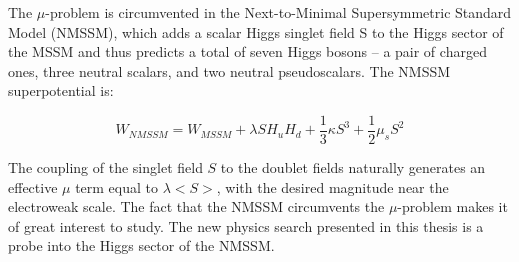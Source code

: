 The $\mu$-problem is circumvented in the Next-to-Minimal Supersymmetric Standard Model (NMSSM), which adds a scalar Higgs singlet field S to the Higgs sector of the MSSM and thus predicts a total of seven Higgs bosons -- a pair of charged ones, three neutral scalars, and two neutral pseudoscalars. The NMSSM superpotential is:

\begin{equation}
W_{NMSSM} = W_{MSSM} + \lambda SH_{u}H_{d} + \frac{1}{3}\kappa S^3 + \frac{1}{2}\mu_{s}S^2
\label{eq:WNMSSM}
\end{equation}

The coupling of the singlet field $S$ to the doublet fields naturally generates an effective $\mu$ term equal to $\lambda$$<S>$, with the desired magnitude near the electroweak scale. The fact that the NMSSM circumvents the $\mu$-problem makes it of great interest to study. The new physics search presented in this thesis is a probe into the Higgs sector of the NMSSM.